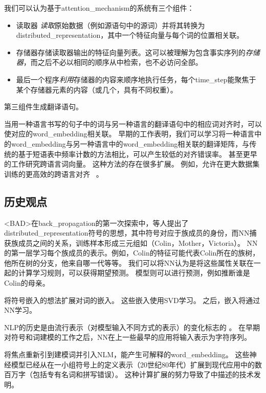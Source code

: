 我们可以认为基于\gls{attention_mechanism}的系统有三个组件：
\begin{itemize}
 \item   读取器 \emph{读取}原始数据（例如源语句中的源词）并将其转换为\gls{distributed_representation}，其中一个特征向量与每个词的位置相关联。
 \item 存储器存储读取器输出的特征向量列表。这可以被理解为包含事实序列的\emph{存储器}，而之后不必以相同的顺序从中检索，也不必访问全部。
 \item 最后一个程序\emph{利用}存储器的内容来顺序地执行任务，每个\gls{time_step}能聚焦于某个存储器元素的内容（或几个，具有不同权重）。
\end{itemize}
第三组件生成翻译语句。


当用一种语言书写的句子中的词与另一种语言的翻译语句中的相应词对齐时，可以使对应的\gls{word_embedding}相关联。
早期的工作表明，我们可以学习将一种语言中的\gls{word_embedding}与另一种语言中的\gls{word_embedding}相关联的翻译矩阵\citep{Kocisky-et-al-ACL2014}，与传统的基于短语表中频率计数的方法相比，可以产生较低的对齐错误率。
甚至更早的工作\citep{Klementiev-et-al-COLING2012}研究跨语言词向量。 
这种方法的存在很多扩展。
例如，允许在更大数据集训练的更高效的跨语言对齐~\citep{Gouws-et-al-arxiv2014} 。

\subsection{历史观点}
\label{sec:historical_perspective_chap12}

<BAD>在\gls{back_propagation}的第一次探索中，\citet{Rumelhart86b-small}等人提出了\gls{distributed_representation}符号的思想，其中符号对应于族成员的身份，而\gls{NN}捕获族成员之间的关系，训练样本形成三元组如（Colin，Mother，Victoria）。
\gls{NN}的第一层学习每个族成员的表示。例如，Colin的特征可能代表Colin所在的族树，他所在树的分支，他来自哪一代等等。
我们可以将\gls{NN}认为是将这些属性关联在一起的计算学习规则，可以获得期望预测。
模型则可以进行预测，例如推断谁是Colin的母亲。

\cite{Deerwester90}将符号嵌入的想法扩展对词的嵌入。
这些嵌入使用SVD学习。 
之后，嵌入将通过\gls{NN}学习。

\gls{NLP}的历史是由流行表示（对模型输入不同方式的表示）的变化标志的  。
在早期对符号和词建模的工作之后，\gls{NN}在上一些最早的应用\citep{Miikkulainen91,Schmidhuber96}将输入表示为字符序列。

\citet{BenDucVin01-small} 将焦点重新引到建模词并引入\gls{NLM}，能产生可解释的\gls{word_embedding}。
这些神经模型已经从在一小组符号上的定义表示（20世纪80年代）扩展到现代应用中的数百万字（包括专有名词和拼写错误）。
这种计算扩展的努力导致了中描述的技术发明。

